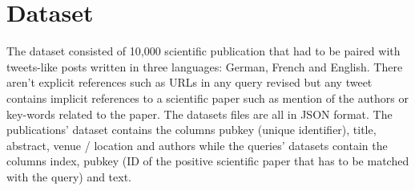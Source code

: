 \section{Dataset}
\label{sec:dataset}

The dataset consisted of 10,000 scientific publication that had to be paired with tweets-like posts written in three languages: German, French and English. There aren't explicit references such as URLs in any query revised but any tweet contains implicit references to a scientific paper such as mention of the authors or key-words related to the paper. The datasets files are all in JSON format. The publications' dataset contains the columns pubkey (unique identifier), title, abstract, venue / location and authors while the queries' datasets contain the columns index, pubkey (ID of the positive scientific paper that has to be matched with the query) and text.


